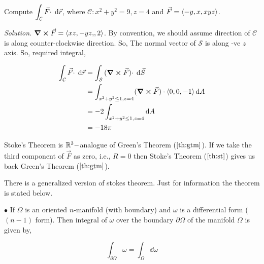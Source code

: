 \documentclass[../Analysis-3]{subfiles}
\begin{document}
\begin{Eg}{}{}
    Compute $\displaystyle\int_{\mathcal{C}} {\vec{F} \cdot } \hspace{0.1cm} \dd {\vec{r}}$, where $\mathcal{C} : x^2 +y^2 = 9, z =4$ and $\vec{F} = \left\langle {-y,x}, {xyz} \right\rangle$.

    \textit{Solution.} $\curl \vec{F} = \left\langle {xz,-yz,}, {2} \right\rangle$. By convention, we should assume direction of $\mathcal{C}$ is along counter-clockwise direction. So,  The normal vector of $\mathcal{S}$ is along -ve $z$ axis. So, required integral,

    \begin{align*}
        \int_{\mathcal{C}} {\vec{F} \cdot } \hspace{0.1cm} \dd {\vec{r}} & = \int_{\mathcal{S}} {(\curl \vec{F}) \cdot} \hspace{0.1cm} \dd {\vec{S}}                     \\
                                                    & = \int_{x^2+y^2 \le 1, z =4 } (\curl \vec{F}) \cdot \left\langle {0,0}, {-1} \right\rangle \dd{A} \\
                                                    & = -2 \int_{x^2+y^2 \le 1, z =4} \dd{A}                                   \\
                                                    & = -18\pi
    \end{align*}

\end{Eg}


Stoke's Theorem is $\mathbb{R}^3-$analogue of Green's Theorem ($\ref{th:gtm}$). If we take the third component of $\vec{F}$ as zero, i.e., $R =0$ then Stoke's Theorem ($\ref{th:st}$) gives us back Green's Theorem ($\ref{th:gtm}$).

\begin{tcolorbox}
    There is a generalized version of stokes theorem. Just for information the theorem is stated below.

    $\bullet$ If $\Omega$ is an oriented $n$-manifold (with boundary) and $\omega$ is a differential form ($(n-1)$ form). Then integral of $\omega$ over the boundary $\partial \Omega$ of the manifold $\Omega$ is given by,

    \[\int_{\partial \Omega} \omega = \int_{\Omega} \dd \omega\]

\end{tcolorbox}
\end{document}
